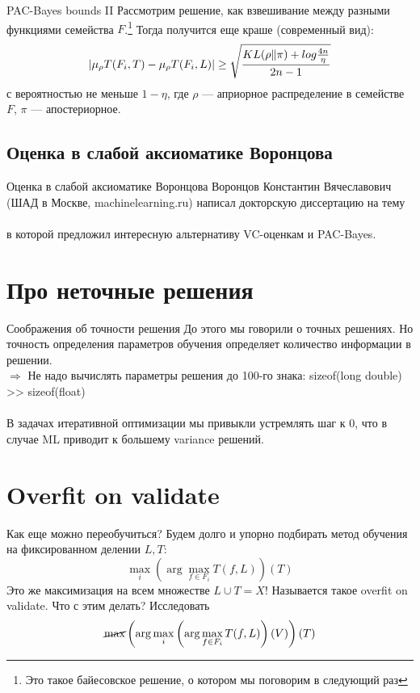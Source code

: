 \documentclass[14pt, fleqn, xcolor={dvipsnames, table}]{beamer}
\begin{document}
\begin{frame}{PAC-Bayes bounds II}
\small
Рассмотрим решение, как взвешивание между разными функциями семейства $F$.\footnote{Это такое байесовское решение, о котором мы поговорим в следующий раз} Тогда получится еще краше (современный вид):
$$
|\mu_\rho T(F_i, T) - \mu_\rho T(F_i, L)| \ge \sqrt{KL(\rho \| \pi) + log \frac{4n}{\eta} \over 2n - 1}
$$
с вероятностью не меньше $1-\eta$, где $\rho$ --- априорное распределение в семействе $F$, $\pi$ --- апостериорное.
\end{frame}

\subsection{Оценка в слабой аксиоматике Воронцова}
\begin{frame}{Оценка в слабой аксиоматике Воронцова}
Воронцов Константин Вячеславович (ШАД в Москве, machinelearning.ru) написал докторскую диссертацию на тему \\
 \\
\flushleft в которой предложил интересную альтернативу VC-оценкам и PAC-Bayes.
\end{frame}

\section{Про неточные решения}
\begin{frame}{Соображения об точности решения}
До этого мы говорили о точных решениях. Но точность определения параметров обучения определяет количество информации в решении. \\
$\Rightarrow$ Не надо вычислять параметры решения до 100-го знака: sizeof(long double) >> sizeof(float) \\
~\\
В задачах итеративной оптимизации мы привыкли устремлять шаг к 0, что в случае ML приводит к большему variance решений.
\end{frame}

\section{Overfit on validate}
\begin{frame}{Как еще можно переобучиться?}
Будем долго и упорно подбирать метод обучения на фиксированном делении $L, T$:
$$
\max_{i} \left(\arg\max_{f \in F_i} T(f, L)\right)(T)
$$
Это же максимизация на всем множестве $L \cup T = X$! Называется такое overfit on validate. Что с этим делать? Исследовать
$$
\cancel{\max} \left(\arg \max_{i} \left(\arg\max_{f \in F_i} T(f, L)\right)(V)\right)(T)
$$
\end{frame}
\end{document}
